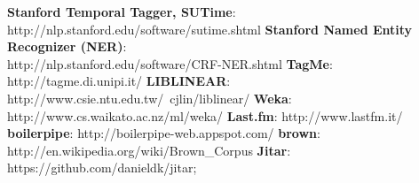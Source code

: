 \documentclass[a4paper]{report}
\begin{document}
\cleardoublepage
\renewcommand\bibname{Riferimenti}
\begin{thebibliography}{n}
\addto\captions{\renewcommand{\thebibliography}{Riferimenti}}
 \textbf{Stanford Temporal Tagger, SUTime}: \\http://nlp.stanford.edu/software/sutime.shtml
 \textbf{Stanford Named Entity Recognizer (NER)}: \\http://nlp.stanford.edu/software/CRF-NER.shtml
 \textbf{TagMe}: http://tagme.di.unipi.it/
 \textbf{LIBLINEAR}: http://www.csie.ntu.edu.tw/~cjlin/liblinear/
 \textbf{Weka}: http://www.cs.waikato.ac.nz/ml/weka/
 \textbf{Last.fm}: http://www.lastfm.it/
 \textbf{boilerpipe}: http://boilerpipe-web.appspot.com/
 \textbf{brown}: http://en.wikipedia.org/wiki/Brown\_Corpus
 \textbf{Jitar}: https://github.com/danieldk/jitar;
\end{thebibliography}
\end{document}
